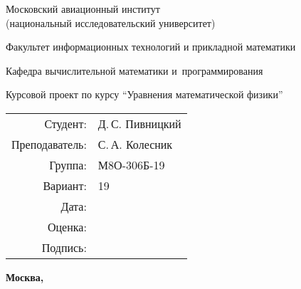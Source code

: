 \begin{titlepage}
\begin{center}
\bfseries

{\Large Московский авиационный институт\\ (национальный исследовательский университет)

}

\vspace{48pt}

{\large Факультет информационных технологий и прикладной математики
}

\vspace{36pt}


{\large Кафедра вычислительной математики и~программирования

}


\vspace{48pt}

Курсовой проект по курсу \enquote{Уравнения математической физики}

\end{center}

\vspace{72pt}

\begin{flushright}
\begin{tabular}{rl}
Студент: & Д.\,С. Пивницкий \\
Преподаватель: & С.\,А. Колесник \\
Группа: & М8О-306Б-19 \\
Вариант: & 19 \\
Дата: & \\
Оценка: & \\
Подпись: & \\
\end{tabular}
\end{flushright}

\vfill

\begin{center}
\bfseries
Москва, \the\year
\end{center}
\end{titlepage}
\tableofcontents
\pagebreak